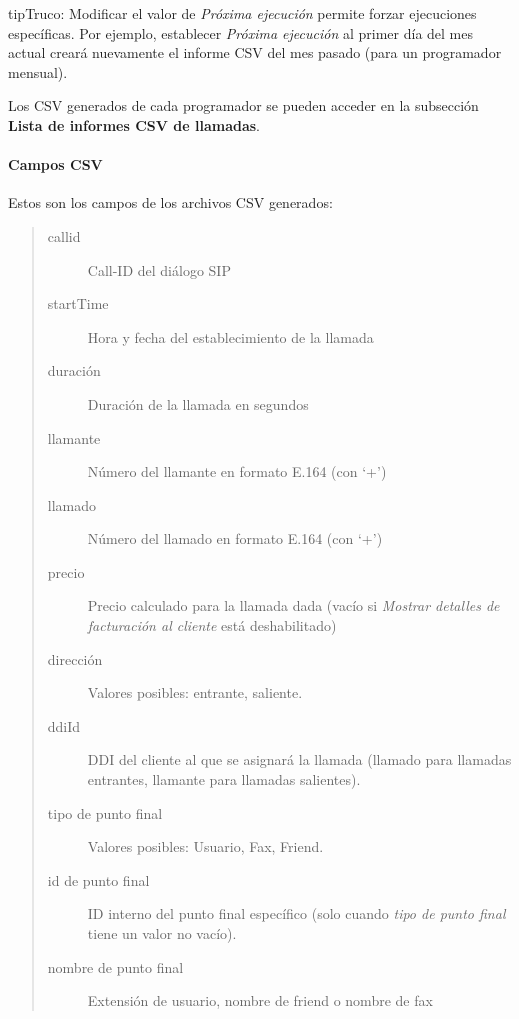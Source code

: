 \documentclass[letterpaper,10pt,spanish]{sphinxmanual}
\begin{document}
\begin{notice}{tip}{Truco:}
Modificar el valor de \emph{Próxima ejecución} permite forzar ejecuciones específicas. Por ejemplo, establecer \emph{Próxima ejecución} al primer día del mes actual creará nuevamente el informe CSV del mes pasado (para un programador mensual).
\end{notice}

Los CSV generados de cada programador se pueden acceder en la subsección \textbf{Lista de informes CSV de llamadas}.


\paragraph{Campos CSV}
\label{administration_portal/client/vpbx/calls/call_csv_schedulers:csv-fields}
Estos son los campos de los archivos CSV generados:
\begin{quote}
\begin{description}
\item[{callid}] \leavevmode
Call-ID del diálogo SIP

\item[{startTime}] \leavevmode
Hora y fecha del establecimiento de la llamada

\item[{duración}] \leavevmode
Duración de la llamada en segundos

\item[{llamante}] \leavevmode
Número del llamante en formato E.164 (con `+')

\item[{llamado}] \leavevmode
Número del llamado en formato E.164 (con `+')

\item[{precio}] \leavevmode
Precio calculado para la llamada dada (vacío si \emph{Mostrar detalles de facturación al cliente} está deshabilitado)

\item[{dirección}] \leavevmode
Valores posibles: entrante, saliente.

\item[{ddiId}] \leavevmode
DDI del cliente al que se asignará la llamada (llamado para llamadas entrantes, llamante para llamadas salientes).

\item[{tipo de punto final}] \leavevmode
Valores posibles: Usuario, Fax, Friend.

\item[{id de punto final}] \leavevmode
ID interno del punto final específico (solo cuando \emph{tipo de punto final} tiene un valor no vacío).

\item[{nombre de punto final}] \leavevmode
Extensión de usuario, nombre de friend o nombre de fax

\end{description}
\end{quote}
\end{document}
